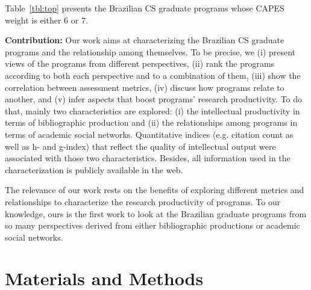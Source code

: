 \documentclass[10pt]{article}
\begin{document}
Table~\ref{tbl:top} presents the Brazilian CS 
graduate programs whose CAPES weight is either 6 or 7.






{\bf Contribution:} Our work aims at characterizing the Brazilian CS graduate
programs and the relationship among themselves. To be precise, we (i) present
views of the programs from different perspectives, (ii) rank the programs
according to both each perspective and to a combination of them, (iii) show the
correlation between assessment metrics, (iv) discuss how programs relate to
another, and (v) infer aspects that boost programs' research productivity.  To
do that, mainly two characteristics are explored: (i) the intellectual
productivity in terms of bibliographic production and (ii) the relationships
among programs in terms of academic social networks. Quantitative indices (e.g.
citation count as well as h- and g-index) that reflect the quality of
intellectual output were associated with those two characteristics.  Besides,
all information used in the characterization is
publicly available in the web.


The relevance of our work rests on the benefits of exploring different metrics and relationships to characterize the research
productivity of programs. To our knowledge, ours is the first work to look at the Brazilian graduate programs from so many
perspectives derived from either bibliographic productions or academic social networks. 



\section*{Materials and Methods}
\label{sec:method}
\end{document}
